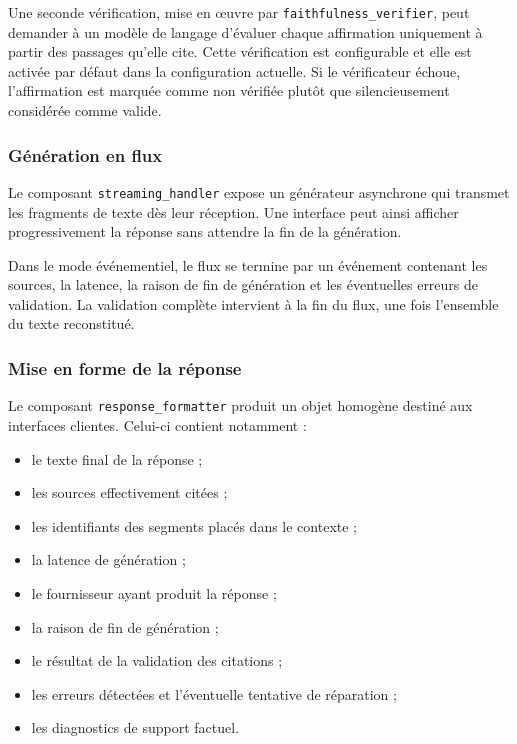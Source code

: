 Une seconde vérification, mise en œuvre par \texttt{faithfulness\_verifier}, peut
demander à un modèle de langage d'évaluer chaque affirmation uniquement à partir des
passages qu'elle cite. Cette vérification est configurable et elle est activée par
défaut dans la configuration actuelle. Si le vérificateur échoue, l'affirmation est
marquée comme non vérifiée plutôt que silencieusement considérée comme valide.

\subsubsection{Génération en flux}

Le composant \texttt{streaming\_handler} expose un générateur asynchrone qui transmet
les fragments de texte dès leur réception. Une interface peut ainsi afficher
progressivement la réponse sans attendre la fin de la génération.

Dans le mode événementiel, le flux se termine par un événement contenant les sources,
la latence, la raison de fin de génération et les éventuelles erreurs de validation.
La validation complète intervient à la fin du flux, une fois l'ensemble du texte
reconstitué.

\subsubsection{Mise en forme de la réponse}

Le composant \texttt{response\_formatter} produit un objet homogène destiné aux
interfaces clientes. Celui-ci contient notamment :

\begin{itemize}
  \item le texte final de la réponse ;
  \item les sources effectivement citées ;
  \item les identifiants des segments placés dans le contexte ;
  \item la latence de génération ;
  \item le fournisseur ayant produit la réponse ;
  \item la raison de fin de génération ;
  \item le résultat de la validation des citations ;
  \item les erreurs détectées et l'éventuelle tentative de réparation ;
  \item les diagnostics de support factuel.
\end{itemize}

